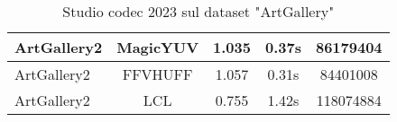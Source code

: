 \begin{table}[ht]
\begin{tabular}{|l|c|c|c|c|}
ArtGallery2                  & MagicYUV  & 1.035                                                            & 0.37s                                                         & 86179404                                                     \\ \hline
ArtGallery2                  & FFVHUFF   & 1.057                                                            & 0.31s                                                         & 84401008                                                     \\ \hline
ArtGallery2                  & LCL       & 0.755                                                            & 1.42s                                                         & 118074884                                                    \\ \hline
\end{tabular}
\caption{Studio codec 2023 sul dataset "ArtGallery"}
\end{table}

